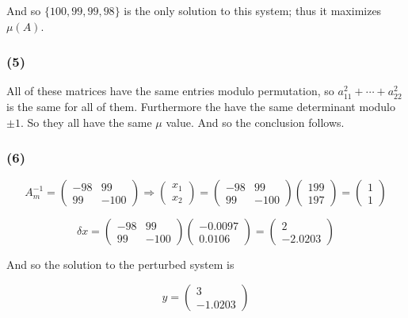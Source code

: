 \documentclass{article}
\begin{document}
And so $\{100,99,99,98\}$ is the only solution to this system; thus it maximizes $\mu(A)$. 

\subsubsection{(5)} 

All of these matrices have the same entries modulo permutation, so $a_{11}^2 + \cdots + a_{22}^2$ is the same for all of them. Furthermore the have the same determinant modulo $\pm 1$. So they all have the same $\mu$ value. And so the conclusion follows. 

\subsubsection{(6)} 

\[A_m^{-1} = \left(\begin{array}{cc} -98 & 99 \\ 99 & -100 \end{array}\right) \Longrightarrow \left(\begin{array}{c} x_1 \\ x_2 \end{array}\right) = \left(\begin{array}{cc} -98 & 99 \\ 99 & -100 \end{array}\right) \left(\begin{array}{c} 199 \\ 197 \end{array}\right) = \left(\begin{array}{c} 1 \\ 1 \end{array}\right) \]

\[\delta x = \left(\begin{array}{cc} -98 & 99 \\ 99 & -100 \end{array}\right) \left(\begin{array}{c} -0.0097 \\ 0.0106 \end{array}\right) = \left(\begin{array}{c} 2 \\ -2.0203 \end{array}\right) \]

And so the solution to the perturbed system is 

\[ y = \left(\begin{array}{c} 3 \\ -1.0203 \end{array}\right) \]
\end{document}
